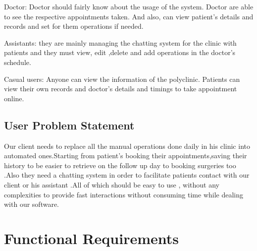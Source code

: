 \documentclass[]{article}
\begin{document}
Doctor: Doctor should fairly know about the usage of the system. Doctor are able to see the respective appointments taken. And also, can view patient’s details and records and set for them operations if needed.


Assistants: they are mainly managing the chatting system for the clinic with patients and they must  view, edit ,delete and add operations in the doctor’s schedule.


Casual users: Anyone can view the information of the polyclinic. Patients can view their own records and doctor’s details and timings to take appointment online.


\subsection{ User Problem Statement}
Our client needs to replace all the manual operations done daily in his clinic into automated ones.Starting from patient's booking their appointments,saving their history to be easier to retrieve on the follow up day to booking surgeries too .Also they need a chatting system in order to facilitate patients contact with our client or his assistant .All of which should be easy to use , without any complexities to provide fast interactions without consuming time while dealing with our software.

\section{Functional Requirements}
\end{document}

